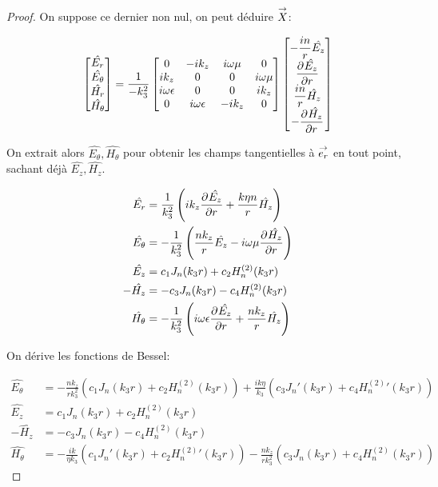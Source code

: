 \begin{proof}
    On suppose ce dernier non nul, on peut déduire \(\vect{X}\):

    \begin{equation}
      \begin{bmatrix}
        \hat{E_r}\\
        \hat{E_\theta}\\
        \hat{H_r}\\
        \hat{H_\theta}
      \end{bmatrix} =
      \frac{1}{-k_3^2}
      \begin{bmatrix}
      0 & -ik_z & i\w\mu & 0
      \\
      ik_z & 0 & 0 & i\w\mu
      \\
      i\w\eps & 0 & 0 & ik_z
      \\
      0 & i\w\eps & -ik_z & 0
      \end{bmatrix}
      \begin{bmatrix}
        -\frac{in}{r}\hat{E_z}\\
        \ddr{r}{\hat{E_z}}\\
        \frac{in}{r}\hat{H_z}\\
        -\ddr{r}{\hat{H_z}}
      \end{bmatrix}
    \end{equation}

    On extrait alors \(\hat{E_\theta}, \hat{H_\theta}\) pour obtenir les champs tangentielles à \(\vect{e_r}\) en tout point, sachant déjà \(\hat{E_z}, \hat{H_z}\).

    \begin{align}
      \hat{E_r} & = \frac{1}{k_3^2}\left(ik_z\ddr{r}{\hat{E_z}}+\frac{k\eta n}{r}\hat{H_z}\right)
      \\
      \hat{E_\theta} &= -\frac{1}{k_3^2}\left(\frac{nk_z}{r}\hat{E_z} - i\w\mu\ddr{r}{\hat{H_z}}\right)
      \\
      \hat{E_z} &= c_1 J_n(k_3 r) + c_2 H_n^{(2)}(k_3 r)
      \\
      -\hat{H_z} &= -c_3 J_n(k_3 r) - c_4 H_n^{(2)}(k_3 r)
      \\
      \hat{H_\theta} &= -\frac{1}{k_3^2}\left(i\w\eps\ddr{r}{\hat{E_z}} + \frac{nk_z}{r}\hat{H_z}\right)
    \end{align}

    On dérive les fonctions de Bessel:

     \begin{align}
      \hat{E_\theta} &= -\frac{nk_z}{rk_3^2}\left(c_1J_n(k_3r) + c_2 H_n^{(2)}(k_3r)\right) + \frac{ik\eta}{k_3}\left(c_3J_n'(k_3r) + c_4 H_n^{(2)}{}'(k_3r)\right)
      \\
      \hat{E_z} &= c_1 J_n(k_3 r) + c_2 H_n^{(2)}(k_3 r)
      \\
      -\hat{H_z} &= -c_3 J_n(k_3 r) - c_4 H_n^{(2)}(k_3 r)
      \\
      \hat{H_\theta} &= -\frac{ik}{\eta k_3}\left(c_1J_n'(k_3r) + c_2 H_n^{(2)}{}'(k_3r)\right) - \frac{nk_z}{rk_3^2}\left(c_3J_n(k_3r) + c_4 H_n^{(2)}(k_3r)\right)
    \end{align}


\end{proof}
